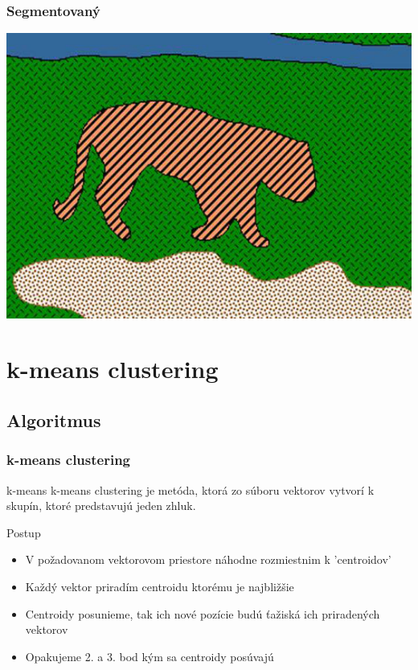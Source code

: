 \documentclass{beamer}
\begin{document}
\begin{frame}
\frametitle{Segmentovaný}
\includegraphics[width=\textwidth]{tiger_segmented.png}
\end{frame}



\section{k-means clustering}

\subsection{Algoritmus}

\begin{frame}
\frametitle{k-means clustering}

\begin{block}{k-means}
k-means clustering je metóda, ktorá zo súboru vektorov vytvorí k skupín, ktoré predstavujú jeden zhluk.
\end{block}

\begin{block}{Postup}
\begin{itemize}
\item V požadovanom vektorovom priestore náhodne rozmiestnim k 'centroidov'
\item Každý vektor priradím centroidu ktorému je najbližšie
\item Centroidy posunieme, tak ich nové pozície budú ťažiská ich priradených vektorov
\item Opakujeme 2. a 3. bod kým sa centroidy posúvajú
\end{itemize}
\end{block}
\end{frame}
\end{document}
